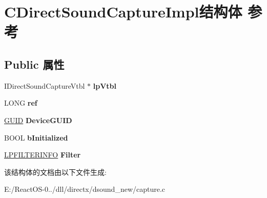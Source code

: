 \hypertarget{struct_c_direct_sound_capture_impl}{}\section{C\+Direct\+Sound\+Capture\+Impl结构体 参考}
\label{struct_c_direct_sound_capture_impl}
\subsection*{Public 属性}
\begin{DoxyCompactItemize}
\item 
\mbox{\label{struct_c_direct_sound_capture_impl_ac71390f2482171ce03e82f7ba2b71999}} 
I\+Direct\+Sound\+Capture\+Vtbl $\ast$ {\bfseries lp\+Vtbl}
\item 
\mbox{\label{struct_c_direct_sound_capture_impl_a2c49885ae4ece2cb35608ff8c90cc454}} 
L\+O\+NG {\bfseries ref}
\item 
\mbox{\label{struct_c_direct_sound_capture_impl_a8b7d375624484ef41e07be21e7b3f856}} 
\hyperlink{interface_g_u_i_d}{G\+U\+ID} {\bfseries Device\+G\+U\+ID}
\item 
\mbox{\label{struct_c_direct_sound_capture_impl_a653cd5ac6ba8bee59842f6150b51a7be}} 
B\+O\+OL {\bfseries b\+Initialized}
\item 
\mbox{\label{struct_c_direct_sound_capture_impl_aceeab77f0834a745a8cce42c0099a590}} 
\hyperlink{structtag_f_i_l_t_e_r_i_n_f_o}{L\+P\+F\+I\+L\+T\+E\+R\+I\+N\+FO} {\bfseries Filter}
\end{DoxyCompactItemize}


该结构体的文档由以下文件生成\+:\begin{DoxyCompactItemize}
\item 
E\+:/\+React\+O\+S-\/0../dll/directx/dsound\+\_\+new/capture.\+c\end{DoxyCompactItemize}
